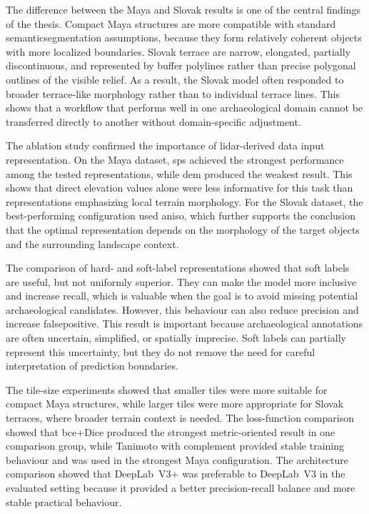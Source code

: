 The difference between the Maya and Slovak results is one of the central findings of the thesis. Compact Maya structures are more compatible with standard \gls{semanticsegmentation} assumptions, because they form relatively coherent objects with more localized boundaries. Slovak terrace are narrow, elongated, partially discontinuous, and represented by \gls{buffer} polylines rather than precise polygonal outlines of the visible relief. As a result, the Slovak model often responded to broader terrace-like morphology rather than to individual terrace lines. This shows that a workflow that performs well in one archaeological domain cannot be transferred directly to another without domain-specific adjustment.

The ablation study confirmed the importance of \gls{lidar}-derived data input representation. On the Maya dataset, \gls{sps} achieved the strongest performance among the tested representations, while \gls{dem} produced the weakest result. This shows that direct elevation values alone were less informative for this task than representations emphasizing local terrain morphology. For the Slovak dataset, the best-performing configuration used \gls{aniso}, which further supports the conclusion that the optimal representation depends on the morphology of the target objects and the surrounding landscape context.

The comparison of hard- and soft-label representations showed that soft labels are useful, but not uniformly superior. They can make the model more inclusive and increase recall, which is valuable when the goal is to avoid missing potential archaeological candidates. However, this behaviour can also reduce precision and increase \gls{falsepositive}. This result is important because archaeological annotations are often uncertain, simplified, or spatially imprecise. Soft labels can partially represent this uncertainty, but they do not remove the need for careful interpretation of prediction boundaries.

The tile-size experiments showed that smaller tiles were more suitable for compact Maya structures, while larger tiles were more appropriate for Slovak terraces, where broader terrain context is needed. The loss-function comparison showed that \gls{bce}+Dice produced the strongest metric-oriented result in one comparison group, while Tanimoto with complement provided stable training behaviour and was used in the strongest Maya configuration. The architecture comparison showed that DeepLab~V3+ was preferable to DeepLab~V3 in the evaluated setting because it provided a better precision-recall balance and more stable practical behaviour.

